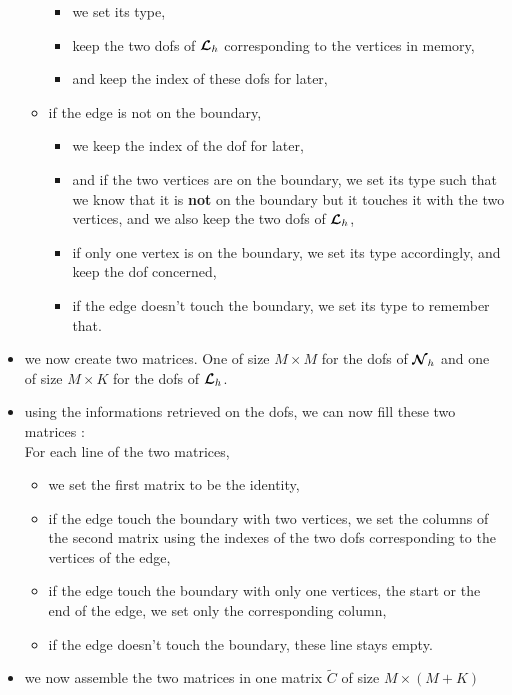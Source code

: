 \begin{itemize}
\begin{itemize}
\begin{itemize}
    \item
      we set its type,
    \item
      keep the two dofs of ${\bm{\mathcal{L}}}_h$ corresponding to the vertices in memory,
    \item
      and keep the index of these dofs for later,
    \end{itemize}
  \item
    if the edge is not on the boundary,
    \begin{itemize}
    \item
      we keep the index of the dof for later,
    \item
      and if the two vertices are on the boundary, we set its type such that we
      know that it is {\bf not} on the boundary but it touches it with the two
      vertices, and we also keep the two dofs of ${\bm{\mathcal{L}}}_h$,
    \item
      if only one vertex is on the boundary, we set its type accordingly, and
      keep the dof concerned,
    \item
      if the edge doesn't touch the boundary, we set its type to remember that.
    \end{itemize}
  \end{itemize}
\item
  we now create two matrices. One of size $M\times M$ for the dofs of ${\bm{\mathcal{N}}}_h$ and one of size $M\times K$ for the dofs of ${\bm{\mathcal{L}}}_h$.
  
\item
  using the informations retrieved on the dofs, we can now fill these two
  matrices :\\
  For each line of the two matrices,
  \begin{itemize}
  \item
    we set the first matrix to be the identity,
  \item
    if the edge touch the boundary with two vertices, we set the columns of
    the second matrix using the indexes of the two dofs corresponding to the
    vertices of the edge,
  \item
    if the edge touch the boundary with only one vertices, the start or the end of the edge, we set only the
    corresponding column,
  \item
    if the edge doesn't touch the boundary, these line stays empty. 
  \end{itemize}
  
\item
  we now assemble the two matrices in one matrix $\tilde{C}$ of size $M\times (M+K)$

\end{itemize}
